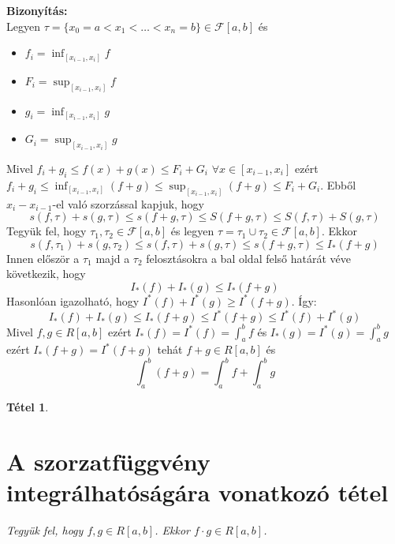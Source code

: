\documentclass{article}
\newtheorem{theorem}{Tétel}
\renewenvironment{proof}{\textbf{Bizonyítás:} \\}{\hfill}
\begin{document}
\begin{proof}
Legyen $\tau=\{x_0=a<x_1<\dots<x_n=b\}\in\mathcal{F}[a,b]$ és
\begin{itemize}
    \item[] $f_i=\displaystyle\inf_{[x_{i-1},x_i]} f$
    \item[] $F_i=\displaystyle\sup_{[x_{i-1},x_i]} f$
    \item[] $g_i=\displaystyle\inf_{[x_{i-1},x_i]} g$
    \item[] $G_i=\displaystyle\sup_{[x_{i-1},x_i]} g$
\end{itemize}
Mivel $f_i+g_i\leq f(x)+g(x)\leq F_i+G_i$ $\forall x\in [x_{i-1},x_i]$ ezért $f_i+g_i\leq \displaystyle\inf_{[x_{i-1},x_i]}(f+g) \leq\displaystyle\sup_{[x_{i-1},x_i]}(f+g) \leq F_i + G_i$. Ebből $x_i-x_{i-1}$-el való szorzással kapjuk, hogy
\begin{equation*}
    s(f,\tau)+s(g,\tau)\leq s(f+g,\tau)\leq S(f+g,\tau)\leq S(f,\tau)+S(g,\tau)
\end{equation*}
Tegyük fel, hogy $\tau_1,\tau_2\in\mathcal{F}[a,b]$ és legyen $\tau = \tau_1 \cup \tau_2\in \mathcal{F}[a,b]$. Ekkor
\begin{equation*}
    s(f,\tau_1)+s(g,\tau_2)\leq s(f,\tau)+s(g,\tau)\leq s(f+g,\tau)\leq I_*(f+g)
\end{equation*}
Innen először a $\tau_1$ majd a $\tau_2$ felosztásokra a bal oldal felső határát véve következik, hogy
\begin{equation*}
I_*(f)+I_*(g)\leq I_*(f+g)
\end{equation*}
Hasonlóan igazolható, hogy $I^*(f)+I^*(g)\geq I^*(f+g)$. Így:
\begin{equation*}
    I_*(f)+I_*(g)\leq I_*(f+g)\leq I^*(f+g)\leq I^*(f)+I^*(g)
\end{equation*}
Mivel $f,g\in R[a,b]$ ezért $I_*(f)=I^*(f)=\int_a^bf$ és $I_*(g)=I^*(g)=\int_a^bg$ ezért $I_*(f+g)=I^*(f+g)$ tehát $f+g\in R[a,b]$ és
\begin{equation*}
\int_a^b(f+g)=\int_a^bf+\int_a^bg
\end{equation*}
\end{proof}
\newpage
\begin{theorem}
\section{A szorzatfüggvény integrálhatóságára vonatkozó tétel} 
Tegyük fel, hogy $f,g\in R[a,b]$. Ekkor $f\cdot g\in R[a,b]$.
\end{theorem}
\end{document}
